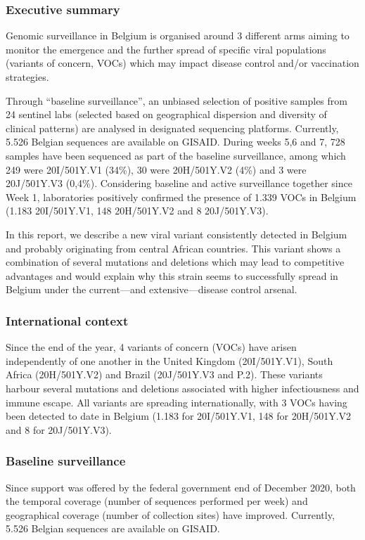\subsubsection{Executive summary}
Genomic surveillance in Belgium is organised around 3 different arms aiming to monitor the emergence and the further spread of specific viral populations (variants of concern, VOCs) which may impact disease control and/or vaccination strategies.

Through ``baseline surveillance'', an unbiased selection of positive samples from 24 sentinel labs (selected based on geographical dispersion and diversity of clinical patterns) are analysed in designated sequencing platforms.
Currently, 5.526 Belgian sequences are available on GISAID. During weeks 5,6 and 7, 728 samples have been sequenced as part of the baseline surveillance, among which 249 were 20I/501Y.V1 (34\%), 30 were 20H/501Y.V2 (4\%) and 3 were 20J/501Y.V3 (0,4\%).
Considering baseline and active surveillance together since Week 1, laboratories positively confirmed the presence of 1.339 VOCs in Belgium (1.183 20I/501Y.V1, 148 20H/501Y.V2 and 8 20J/501Y.V3).

In this report, we describe a new viral variant consistently detected in Belgium and probably originating from central African countries.
This variant shows a combination of several mutations and deletions which may lead to competitive advantages and would explain why this strain seems to successfully spread in Belgium under the current---and extensive---disease control arsenal.

\subsubsection{International context}
Since the end of the year, 4 variants of concern (VOCs) have arisen independently of one another in the United Kingdom (20I/501Y.V1), South Africa (20H/501Y.V2) and Brazil (20J/501Y.V3 and P.2).
These variants harbour several mutations and deletions associated with higher infectiousness and immune escape.
All variants are spreading internationally, with 3 VOCs having been detected to date in Belgium (1.183 for 20I/501Y.V1, 148 for 20H/501Y.V2 and 8 for 20J/501Y.V3).

\subsubsection{Baseline surveillance}
Since support was offered by the federal government end of December 2020, both the temporal coverage (number of sequences performed per week) and geographical coverage (number of collection sites) have improved.
Currently, 5.526 Belgian sequences are available on GISAID.

